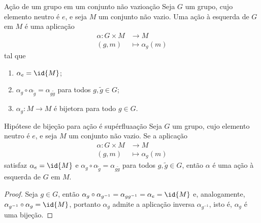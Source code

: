 \begin{definition}{Ação de um grupo em um conjunto não vazio}{ação}
    Seja \(G\) um grupo, cujo elemento neutro é \(e\), e seja \(M\) um conjunto não vazio. Uma ação à esquerda de \(G\) em \(M\) é uma aplicação
    \begin{align*}
        \alpha : G \times M &\to M\\
                      (g,m) &\mapsto \alpha_g(m)
    \end{align*}
    tal que
    \begin{enumerate}[label=(\alph*)]
        \item \(\alpha_e = \id{M}\);
        \item \(\alpha_g \circ \alpha_{\tilde{g}} = \alpha_{g \tilde{g}}\) para todos \(g, \tilde{g} \in G\);
        \item \(\alpha_g : M \to M\) é bijetora para todo \(g \in G\).
    \end{enumerate}
\end{definition}
\begin{lemma}{Hipótese de bijeção para ação é supérflua}{ação}
    Seja \(G\) um grupo, cujo elemento neutro é \(e\), e seja \(M\) um conjunto não vazio. Se a aplicação
    \begin{align*}
        \alpha : G \times M &\to M\\
                      (g,m) &\mapsto \alpha_g(m)
    \end{align*}
    satisfaz \(\alpha_e = \id{M}\) e \(\alpha_g \circ \alpha_{\tilde{g}} = \alpha_{g \tilde{g}}\) para todos \(g, \tilde{g} \in G\), então \(\alpha\) é uma ação à esquerda de \(G\) em \(M\).
\end{lemma}
\begin{proof}
    Seja \(g \in G\), então \(\alpha_{g} \circ \alpha_{g^{-1}} = \alpha_{g g^{-1}} = \alpha_{e} = \id{M}\) e, analogamente, \(\alpha_{g^{-1}} \circ \alpha_{g} = \id{M}\), portanto \(\alpha_{g}\) admite a aplicação inversa \(\alpha_{g^{-1}}\), isto é, \(\alpha_g\) é uma bijeção.
\end{proof}
